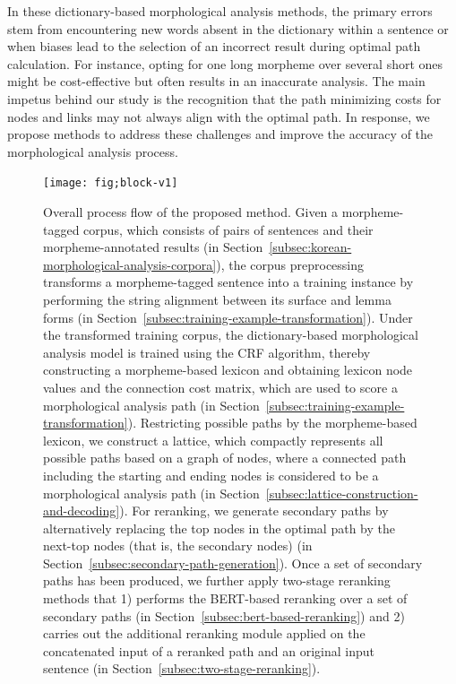 \documentclass[AMS,STIX2COL]{WileyNJD-v2}
\begin{document}
    In these dictionary-based morphological analysis methods, the primary errors stem from encountering new words absent in the dictionary within a sentence or when biases lead to the selection of an incorrect result during optimal path calculation.
    For instance, opting for one long morpheme over several short ones might be cost-effective but often results in an inaccurate analysis.
    The main impetus behind our study is the recognition that the path minimizing costs for nodes and links may not always align with the optimal path.
    In response, we propose methods to address these challenges and improve the accuracy of the morphological analysis process.

    \begin{figure}[ht]
        \centerline{\texttt{[image: fig;block-v1]}}
        \caption{Overall process flow of the proposed method. Given a morpheme-tagged corpus, which consists of pairs of sentences and their morpheme-annotated results (in Section~\ref{subsec:korean-morphological-analysis-corpora}), the corpus preprocessing transforms a morpheme-tagged sentence into a training instance by performing the string alignment between its surface and lemma forms (in Section~\ref{subsec:training-example-transformation}). Under the transformed training corpus, the dictionary-based morphological analysis model is trained using the CRF algorithm, thereby constructing a morpheme-based lexicon and obtaining lexicon node values and the connection cost matrix, which are used to score a morphological analysis path (in Section~\ref{subsec:training-example-transformation}). Restricting possible paths by the morpheme-based lexicon, we construct a lattice, which compactly represents all possible paths based on a graph of nodes, where a connected path including the starting and ending nodes is considered to be a morphological analysis path (in Section~\ref{subsec:lattice-construction-and-decoding}). For reranking, we generate secondary paths by alternatively replacing the top nodes in the optimal path by the next-top nodes (that is, the secondary nodes) (in Section~\ref{subsec:secondary-path-generation}). Once a set of secondary paths has been produced, we further apply two-stage reranking methods that 1) performs the BERT-based reranking over a set of secondary paths (in Section~\ref{subsec:bert-based-reranking}) and 2) carries out the additional reranking module applied on the concatenated input of a reranked path and an original input sentence (in Section~\ref{subsec:two-stage-reranking}).}
        \label{fig:block}
    \end{figure}
\end{document}
